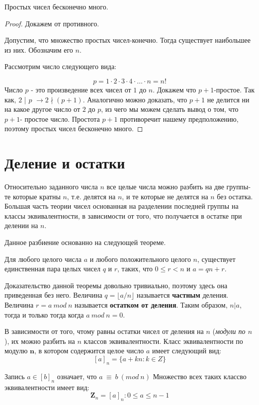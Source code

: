 \begin{Lem}
Простых чисел бесконечно много.
\end{Lem}
\begin{proof}
Докажем от противного.

Допустим, что множество простых чисел-конечно. Тогда существует наибольшее из них. Обозначим его $n$.

Рассмотрим число следующего вида:

$$p=1\cdot 2 \cdot 3 \cdot 4 \cdot \ldots \cdot n = n!$$
Число $p$ - это произведение всех чисел от $1$ до $n$. Докажем что $p+1$-простое.
Так как, $2$ | $p$ $\rightarrow 2 \nmid (p+1)$. Аналогично можно доказать, что $p+1$ не делится ни на какое другое число от $2$ до $p$, из чего мы можем сделать вывод о том, что $p+1$- простое число. Простота  $p+1$ противоречит нашему предположению, поэтому простых чисел бесконечно много.  
\end{proof}

\section{Деление и остатки}
Относительно заданного числа $n$ все целые числа можно разбить на две группы- те которые кратны $n$, т.е. делятся на $n$, и те которые не делятся на $n$ без остатка. Большая часть теории чисел основанная на разделении последней группы на классы эквивалентности, в зависимости от того, что получается в остатке при делении на $n$. 

Данное разбиение основанно на следующей теореме.
\begin{Lem}[О делении]
Для любого целого числа $a$ и любого положительного целого $n$, существует единственная пара целых чисел $q$ и $r$, таких, что $0\leq r < n$ и $a=qn+r$. 
\end{Lem}
Доказательство данной теоремы довольно тривиально, поэтому здесь она приведенная без него.
Величина $q=\lfloor a/n \rfloor$ называется \textbf{частным} деления. Величина $r=a\ mod\ n$ называется \textbf{остатком от деления}. Таким образом, $n | a$, тогда и только тогда когда $a\ mod\ n=0$.

В зависимости от того, чтому равны остатки чисел от деления на $n$ (\textit{модули по $n$}), их можно разбить на $n$ классов эквивалентности.
Класс эквивалентности по модулю $\textbf{n}$, в котором содержится целое число $a$ имеет следующий вид:
$$ [a]_n=\{a+kn :k \in Z\}$$

Запись $a \in [b]_n$ означает, что  $a\ \equiv \ b \ ( mod\ n)$
Множество всех таких классво эквивалентности имеет вид:
$$ \textbf{Z}_n={[a]_n: 0\leq a\leq n-1}$$

